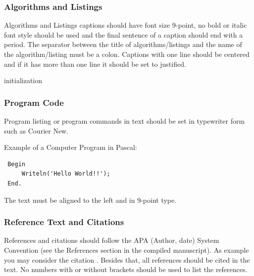 \documentclass[a4paper,twoside]{article}
\begin{document}
\subsubsection{Algorithms and Listings}

Algorithms and Listings captions should have font size 9-point, no bold or italic font style should be used and the final sentence of a caption should end with a period. The separator between the title of algorithms/listings and the name of the algorithm/listing must be a colon.
Captions with one line should be centered and if it has more than one line it should be set to justified.

\begin{algorithm}[!h]
 \caption{How to write algorithms.}
 initialization\;
\end{algorithm}


\bigskip
\subsubsection{Program Code}\label{subsubsec:program_code}

Program listing or program commands in text should be set in typewriter form such as Courier New.

Example of a Computer Program in Pascal:

\begin{small}
\begin{verbatim}
 Begin
     Writeln('Hello World!!');
 End.
\end{verbatim}
\end{small}


The text must be aligned to the left and in 9-point type.

\subsubsection{Reference Text and Citations}

References and citations should follow the APA (Author, date) System Convention (see the References section in the compiled manuscript). As example you may consider the citation \cite{Smith98}. Besides that, all references should be cited in the text. No numbers with or without brackets should be used to list the references.
\end{document}
